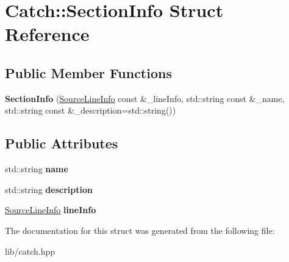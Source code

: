 \hypertarget{struct_catch_1_1_section_info}{}\section{Catch\+:\+:Section\+Info Struct Reference}
\label{struct_catch_1_1_section_info}
\subsection*{Public Member Functions}
\begin{DoxyCompactItemize}
\item 
\mbox{\label{struct_catch_1_1_section_info_a27aff3aaf8b6611f3651b17111a272c6}} 
{\bfseries Section\+Info} (\mbox{\hyperlink{struct_catch_1_1_source_line_info}{Source\+Line\+Info}} const \&\+\_\+line\+Info, std\+::string const \&\+\_\+name, std\+::string const \&\+\_\+description=std\+::string())
\end{DoxyCompactItemize}
\subsection*{Public Attributes}
\begin{DoxyCompactItemize}
\item 
\mbox{\label{struct_catch_1_1_section_info_a704c8fc662d309137e0d4f199cb7df58}} 
std\+::string {\bfseries name}
\item 
\mbox{\label{struct_catch_1_1_section_info_a0052060219a6de74bb7ade34d4163a4e}} 
std\+::string {\bfseries description}
\item 
\mbox{\label{struct_catch_1_1_section_info_adbc83b8a3507c4acc8ee249e93465711}} 
\mbox{\hyperlink{struct_catch_1_1_source_line_info}{Source\+Line\+Info}} {\bfseries line\+Info}
\end{DoxyCompactItemize}


The documentation for this struct was generated from the following file\+:\begin{DoxyCompactItemize}
\item 
lib/catch.\+hpp\end{DoxyCompactItemize}
